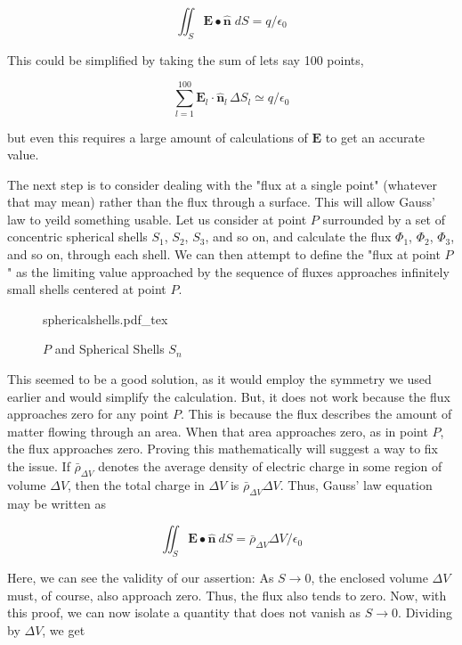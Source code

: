 \documentclass[11pt]{article}
\newcommand{\incfig}[2][1]{%
    \def\svgwidth{#1\columnwidth}
    {#2.pdf_tex}
}
\begin{document}
\begin{equation}
	\iint_S \mathbf{E} \bullet \mathbf{\hat{n}} \; dS = q/\epsilon_0
\end{equation}


This could be simplified by taking the sum of lets say 100 points,

\begin{equation}
	\sum_{l=1}^{100} \mathbf{E}_l \cdot \mathbf{\hat{n}}_l \, \Delta S_l \simeq q/\epsilon_0
\end{equation}


but even this requires a large amount of calculations of $\mathbf{E}$ to get an accurate value.

The next step is to consider dealing with the "flux at a single point" (whatever that may mean) rather than the flux through a surface. This will allow Gauss' law to yeild something usable. Let us consider at point $P$ surrounded by a set of concentric spherical shells $S_1$, $S_2$, $S_3$, and so on, and calculate the flux $\Phi_1$, $\Phi_2$, $\Phi_3$, and so on, through each shell. We can then attempt to define the "flux at point $P$" as the limiting value approached by the sequence of fluxes approaches infinitely small shells centered at point $P$.

\begin{figure}[ht]
    \centering
    \incfig{sphericalshells}
    \caption{$P$ and Spherical Shells $S_n$}
    \label{fig:sphericalshells}
\end{figure}

This seemed to be a good solution, as it would employ the symmetry we used earlier and would simplify the calculation. But, it does not work because the flux approaches zero for any point $P$. This is because the flux describes the amount of matter flowing through an area. When that area approaches zero, as in point $P$, the flux approaches zero. Proving this mathematically will suggest a way to fix the issue. If $\bar{\rho}_{\Delta V}$ denotes the average density of electric charge in some region of volume $\Delta V$, then the total charge in $\Delta V$ is $\bar{\rho}_{\Delta V} \Delta V$. Thus, Gauss' law equation may be written as 

\begin{equation}
	\iint_S \mathbf{E} \bullet \mathbf{\hat{n}} \: dS = \bar{\rho}_{\Delta V} \Delta V / \epsilon_0
\end{equation}

Here, we can see the validity of our assertion: As $S \rightarrow 0$, the enclosed volume $\Delta V$ must, of course, also approach zero. Thus, the flux also tends to zero. Now, with this proof, we can now isolate a quantity that does not vanish as $S \rightarrow 0$. Dividing by $\Delta V$, we get
\end{document}
